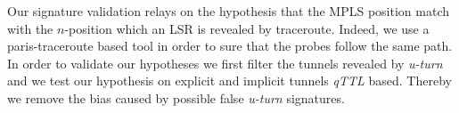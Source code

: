 
Our signature validation relays on the hypothesis that the MPLS position match
with the $n$-position  which an LSR is revealed by traceroute. Indeed,
we use a paris-traceroute \cite{BRICE06}  based tool in order to sure that the probes follow the
same path. In order to validate our hypotheses we first filter the tunnels revealed by \textit{u-turn} and we test our hypothesis on explicit and implicit tunnels \textit{qTTL} based. Thereby we remove the bias caused by possible false
\textit{u-turn} signatures.  

